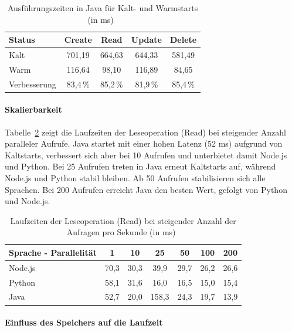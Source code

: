\begin{table}[H]
\centering
\caption{Ausführungszeiten in Java für Kalt- und Warmstarts (in ms)~\cite{Rodriguez2024Evaluation}}
\label{tab:rodriguez-java}
\begin{tabular}{lcccc}
\hline
\textbf{Status} & \textbf{Create} & \textbf{Read} & \textbf{Update} & \textbf{Delete} \\
\hline
Kalt  & 701,19 & 664,63 & 644,33 & 581,49 \\
Warm  & 116,64 & 98,10 & 116,89 & 84,65 \\
Verbesserung & 83,4\,\% & 85,2\,\% & 81,9\,\% & 85,4\,\% \\
\hline
\end{tabular}
\end{table}

\paragraph{Skalierbarkeit}
Tabelle~\ref{tab:rodriguez-scalability} zeigt die Laufzeiten der Leseoperation (Read) bei steigender Anzahl paralleler Aufrufe.
Java startet mit einer hohen Latenz (52 ms) aufgrund von Kaltstarts, verbessert sich aber bei 10 Aufrufen und 
unterbietet damit Node.js und Python. Bei 25 Aufrufen treten in Java erneut Kaltstarts auf, 
während Node.js und Python stabil bleiben. Ab 50 Aufrufen stabilisieren sich alle Sprachen. Bei 200 Aufrufen erreicht 
Java den besten Wert, gefolgt von Python und Node.js.

\begin{table}[H]
\centering
\caption{Laufzeiten der Leseoperation (Read) bei steigender Anzahl der Anfragen pro Sekunde (in ms)~\cite{Rodriguez2024Evaluation}}
\label{tab:rodriguez-scalability}
\begin{tabular}{lcccccc}
\hline
\textbf{Sprache - Parallelität} & \textbf{1} & \textbf{10} & \textbf{25} & \textbf{50} & \textbf{100} & \textbf{200} \\
\hline
Node.js & 70,3 & 30,3 & 39,9 & 29,7 & 26,2 & 26,6 \\
Python  & 58,1 & 31,6 & 16,0 & 16,5 & 15,0 & 15,4 \\
Java    & 52,7 & 20,0 & 158,3 & 24,3 & 19,7 & 13,9 \\
\hline
\end{tabular}
\end{table}

\paragraph{Einfluss des Speichers auf die Laufzeit}

